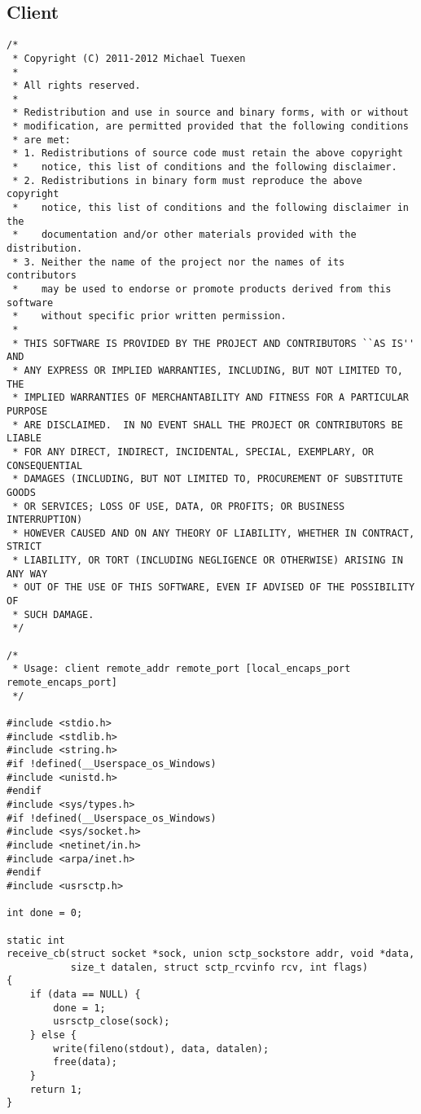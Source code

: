 \documentclass[a4paper]{article}
\begin{document}
\subsection{Client}\label{client}
\begin{verbatim}
/*
 * Copyright (C) 2011-2012 Michael Tuexen
 *
 * All rights reserved.
 *
 * Redistribution and use in source and binary forms, with or without
 * modification, are permitted provided that the following conditions
 * are met:
 * 1. Redistributions of source code must retain the above copyright
 *    notice, this list of conditions and the following disclaimer.
 * 2. Redistributions in binary form must reproduce the above copyright
 *    notice, this list of conditions and the following disclaimer in the
 *    documentation and/or other materials provided with the distribution.
 * 3. Neither the name of the project nor the names of its contributors
 *    may be used to endorse or promote products derived from this software
 *    without specific prior written permission.
 *
 * THIS SOFTWARE IS PROVIDED BY THE PROJECT AND CONTRIBUTORS ``AS IS'' AND
 * ANY EXPRESS OR IMPLIED WARRANTIES, INCLUDING, BUT NOT LIMITED TO, THE
 * IMPLIED WARRANTIES OF MERCHANTABILITY AND FITNESS FOR A PARTICULAR PURPOSE
 * ARE DISCLAIMED.	IN NO EVENT SHALL THE PROJECT OR CONTRIBUTORS BE LIABLE
 * FOR ANY DIRECT, INDIRECT, INCIDENTAL, SPECIAL, EXEMPLARY, OR CONSEQUENTIAL
 * DAMAGES (INCLUDING, BUT NOT LIMITED TO, PROCUREMENT OF SUBSTITUTE GOODS
 * OR SERVICES; LOSS OF USE, DATA, OR PROFITS; OR BUSINESS INTERRUPTION)
 * HOWEVER CAUSED AND ON ANY THEORY OF LIABILITY, WHETHER IN CONTRACT, STRICT
 * LIABILITY, OR TORT (INCLUDING NEGLIGENCE OR OTHERWISE) ARISING IN ANY WAY
 * OUT OF THE USE OF THIS SOFTWARE, EVEN IF ADVISED OF THE POSSIBILITY OF
 * SUCH DAMAGE.
 */

/*
 * Usage: client remote_addr remote_port [local_encaps_port remote_encaps_port]
 */

#include <stdio.h>
#include <stdlib.h>
#include <string.h>
#if !defined(__Userspace_os_Windows)
#include <unistd.h>
#endif
#include <sys/types.h>
#if !defined(__Userspace_os_Windows)
#include <sys/socket.h>
#include <netinet/in.h>
#include <arpa/inet.h>
#endif
#include <usrsctp.h>

int done = 0;

static int
receive_cb(struct socket *sock, union sctp_sockstore addr, void *data,
           size_t datalen, struct sctp_rcvinfo rcv, int flags)
{
    if (data == NULL) {
        done = 1;
        usrsctp_close(sock);
    } else {
        write(fileno(stdout), data, datalen);
        free(data);
    }
    return 1;
}


\end{verbatim}
\end{document}
